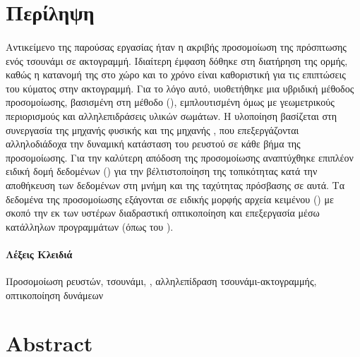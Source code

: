 \section*{Περίληψη}
\paragraph{} Αντικείμενο της παρούσας εργασίας ήταν η ακριβής προσομοίωση της
πρόσ\-πτω\-σης ενός τσουνάμι σε ακτογραμμή. Ιδιαίτερη έμφαση δόθηκε στη διατήρηση της
ορμής, καθώς η κατανομή της στο χώρο και το χρόνο είναι καθοριστική για τις επιπτώσεις του
κύματος στην ακτογραμμή. Για το λόγο αυτό, υιοθετήθηκε μια υβριδική μέθοδος προσομοίωσης,
βασισμένη στη μέθοδο  (), εμπλουτισμένη όμως
με γεωμετρικούς περιορισμούς και αλληλεπιδράσεις υλικών σωμάτων. Η υλοποίηση βασίζεται στη
συνεργασία της μηχανής φυσικής  και της μηχανής , που επεξεργάζονται
αλληλοδιάδοχα την δυναμική κατάσταση του ρευστού σε κάθε βήμα της προσομοίωσης. Για την
καλύτερη απόδοση της προσομοίωσης αναπτύχθηκε επιπλέον ειδική δομή δεδομένων () για την βέλτιστοποίηση της τοπικότητας κατά την αποθήκευση των δεδομένων στη
μνήμη και της ταχύτητας πρόσβασης σε αυτά. Τα δεδομένα της προσομοίωσης εξάγονται σε
ειδικής μορφής αρχεία κειμένου () με σκοπό την εκ των υστέρων διαδραστική
οπτικοποίηση και επεξεργασία μέσω κατάλληλων προγραμμάτων (όπως του ).

\paragraph{Λέξεις Κλειδιά} Προσομοίωση ρευστών, τσουνάμι, , αλληλεπίδραση
τσουνάμι-α\-κτο\-γραμ\-μής, οπτικοποίηση δυνάμεων
\cleardoublepage
\section*{Abstract}
